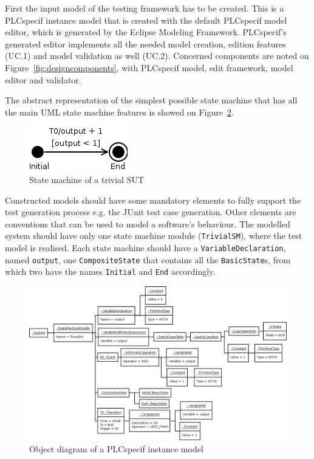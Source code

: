 First the input model of the testing framework has to be created. This is a PLCspecif instance model that is created with the default PLCspecif model editor, which is generated by the Eclipse Modeling Framework. PLCspecif's generated editor implements all the needed model creation, edition features (UC.1) and model validation as well (UC.2). Concerned components are noted on Figure~\ref{fig:designcomponents}, with PLCspecif model, edit framework, model editor and validator.
	
The abstract representation of the simplest possible state machine that has all the main UML state machine features is showed on Figure~\ref{fig:implementation_model}.
	
\begin{figure}[htp]
\centering
\includegraphics[scale=0.4]{figures/implementation_trivialsm}
\caption{State machine of a trivial SUT}
\label{fig:implementation_trivialsm}
\end{figure}

Constructed models should have some mandatory elements to fully support the test generation process e.g. the JUnit test case generation. Other elements are conventions that can be used to model a software's behaviour. The modelled system should have only one state machine module (\texttt{TrivialSM}), where the test model is realised. Each state machine should have a \texttt{VariableDeclaration}, named \texttt{output}, one \texttt{CompositeState} that contains all the \texttt{BasicState}s, from which two have the names \texttt{Initial} and \texttt{End} accordingly.
	
\begin{figure}[htp]
\centering
\includegraphics[scale=0.4]{figures/implementation_model}
\caption{Object diagram of a PLCspecif instance model}
\label{fig:implementation_model}
\end{figure}
	
